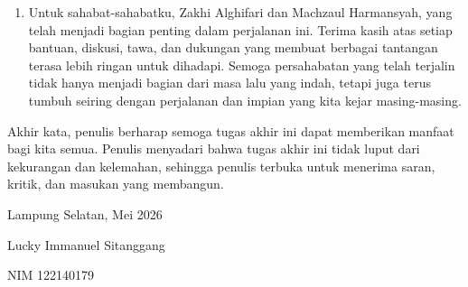 \begin{justifying}
\begin{enumerate}
		\item Untuk sahabat-sahabatku, Zakhi Alghifari dan Machzaul Harmansyah, yang telah menjadi bagian penting dalam perjalanan ini. Terima kasih atas setiap bantuan, diskusi, tawa, dan dukungan yang membuat berbagai tantangan terasa lebih ringan untuk dihadapi. Semoga persahabatan yang telah terjalin tidak hanya menjadi bagian dari masa lalu yang indah, tetapi juga terus tumbuh seiring dengan perjalanan dan impian yang kita kejar masing-masing.
	\end{enumerate} \par
	Akhir kata, penulis berharap semoga tugas akhir ini dapat memberikan manfaat bagi kita semua. Penulis menyadari bahwa tugas akhir ini tidak luput dari kekurangan dan kelemahan, sehingga penulis terbuka untuk menerima saran, kritik, dan masukan yang membangun.
	\vfill

	\begin{flushright}
		Lampung Selatan, Mei 2026 \par
		\vspace{5em}
		Lucky Immanuel Sitanggang \par
		NIM 122140179
	\end{flushright}

\end{justifying}
\clearpage





